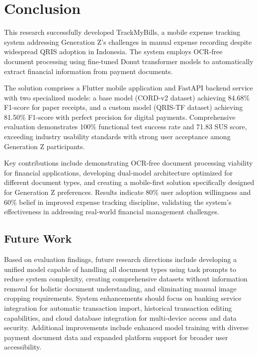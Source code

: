 \section{Conclusion}

This research successfully developed TrackMyBills, a mobile expense tracking system addressing Generation Z's challenges in manual expense recording despite widespread QRIS adoption in Indonesia. The system employs OCR-free document processing using fine-tuned Donut transformer models to automatically extract financial information from payment documents.

The solution comprises a Flutter mobile application and FastAPI backend service with two specialized models: a base model (CORD-v2 dataset) achieving 84.68\% F1-score for paper receipts, and a custom model (QRIS-TF dataset) achieving 81.50\% F1-score with perfect precision for digital payments. Comprehensive evaluation demonstrates 100\% functional test success rate and 71.83 SUS score, exceeding industry usability standards with strong user acceptance among Generation Z participants.

Key contributions include demonstrating OCR-free document processing viability for financial applications, developing dual-model architecture optimized for different document types, and creating a mobile-first solution specifically designed for Generation Z preferences. Results indicate 80\% user adoption willingness and 60\% belief in improved expense tracking discipline, validating the system's effectiveness in addressing real-world financial management challenges.

\subsection{Future Work}
Based on evaluation findings, future research directions include developing a unified model capable of handling all document types using task prompts to reduce system complexity, creating comprehensive datasets without information removal for holistic document understanding, and eliminating manual image cropping requirements. System enhancements should focus on banking service integration for automatic transaction import, historical transaction editing capabilities, and cloud database integration for multi-device access and data security. Additional improvements include enhanced model training with diverse payment document data and expanded platform support for broader user accessibility.